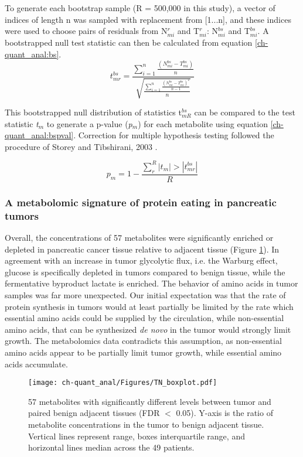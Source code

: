 To generate each bootstrap sample (R = 500,000 in this study), a vector of indices of length n was sampled with replacement from [1...n], and these indices were used to choose pairs of residuals from N$^{r}_{mi}$ and T$^{r}_{mi}$: N$^{bs}_{mi}$ and T$^{bs}_{mi}$.  A bootstrapped null test statistic can then be calculated from equation \ref{ch-quant_anal:bs}.
\begin{equation}
t^{bs}_{mr} = \frac{\sum_{i = 1}^{n}\frac{(N^{bs}_{mi} - T^{bs}_{mi})}{n}}{\sqrt{\frac{\sum_{i = 1}^{n}\frac{(N^{bs}_{mi} - T^{bs}_{mi})^{2}}{n-1}}{n}}}\label{ch-quant_anal:bs}
\end{equation}

This bootstrapped null distribution of statistics t$^{bs}_{mR}$ can be compared to the test statistic \textit{t}$_{m}$ to generate a p-value (\textit{p}$_{m}$) for each metabolite using equation \ref{ch-quant_anal:bspval}. Correction for multiple hypothesis testing followed the procedure of Storey and Tibshirani, 2003 \cite{Storey:2003cj}.

\begin{equation}
p_{m} = 1 - \frac{\sum_{r}^{R}|t_{m}| > |t_{mr}^{bs}|}{R}\label{ch-quant_anal:bspval}
\end{equation}

\subsubsection{A metabolomic signature of protein eating in pancreatic tumors}

Overall, the concentrations of 57 metabolites were significantly enriched or depleted in pancreatic cancer tissue relative to adjacent tissue (Figure \ref{ch-quant_anal:tnboxplot}).  In agreement with an increase in tumor glycolytic flux, i.e. the Warburg effect, glucose is specifically depleted in tumors compared to benign tissue, while the fermentative byproduct lactate is enriched.  The behavior of amino acids in tumor samples was far more unexpected.  Our initial expectation was that the rate of protein synthesis in tumors would at least partially be limited by the rate which essential amino acids could be supplied by the circulation, while non-essential amino acids, that can be synthesized \textit{de novo} in the tumor would strongly limit growth. The metabolomics data contradicts this assumption, as non-essential amino acids appear to be partially limit tumor growth, while essential amino acids accumulate. 

\begin{figure}[h!]
\begin{center}
\texttt{[image: ch-quant\_anal/Figures/TN\_boxplot.pdf]}
\caption[Metabolites accumulated or depleted in pancreatic cancer]{57 metabolites with significantly different levels between tumor and paired benign adjacent tissues (FDR $<$ 0.05). Y-axis is the ratio of metabolite concentrations in the tumor to benign adjacent tissue. Vertical lines represent range, boxes interquartile range, and horizontal lines median across the 49 patients.}
\label{ch-quant_anal:tnboxplot}
\end{center}
\end{figure}

